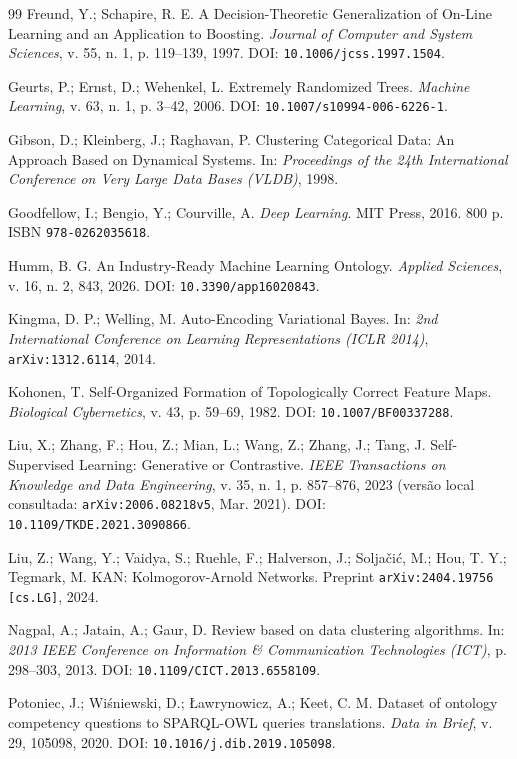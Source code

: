 \documentclass[11pt,a4paper]{article}
\begin{document}
{\begin{thebibliography}{99}
Freund, Y.; Schapire, R. E. A Decision-Theoretic Generalization of On-Line Learning and an Application to Boosting. \emph{Journal of Computer and System Sciences}, v. 55, n. 1, p. 119--139, 1997. DOI: \texttt{10.1006/jcss.1997.1504}.

Geurts, P.; Ernst, D.; Wehenkel, L. Extremely Randomized Trees. \emph{Machine Learning}, v. 63, n. 1, p. 3--42, 2006. DOI: \texttt{10.1007/s10994-006-6226-1}.

Gibson, D.; Kleinberg, J.; Raghavan, P. Clustering Categorical Data: An Approach Based on Dynamical Systems. In: \emph{Proceedings of the 24th International Conference on Very Large Data Bases (VLDB)}, 1998.

Goodfellow, I.; Bengio, Y.; Courville, A. \emph{Deep Learning}. MIT Press, 2016. 800 p. ISBN \texttt{978-0262035618}.

Humm, B. G. An Industry-Ready Machine Learning Ontology. \emph{Applied Sciences}, v. 16, n. 2, 843, 2026. DOI: \texttt{10.3390/app16020843}.

Kingma, D. P.; Welling, M. Auto-Encoding Variational Bayes. In: \emph{2nd International Conference on Learning Representations (ICLR 2014)}, \texttt{arXiv:1312.6114}, 2014.

Kohonen, T. Self-Organized Formation of Topologically Correct Feature Maps. \emph{Biological Cybernetics}, v. 43, p. 59--69, 1982. DOI: \texttt{10.1007/BF00337288}.

Liu, X.; Zhang, F.; Hou, Z.; Mian, L.; Wang, Z.; Zhang, J.; Tang, J. Self-Supervised Learning: Generative or Contrastive. \emph{IEEE Transactions on Knowledge and Data Engineering}, v. 35, n. 1, p. 857--876, 2023 (versão local consultada: \texttt{arXiv:2006.08218v5}, Mar. 2021). DOI: \texttt{10.1109/TKDE.2021.3090866}.

Liu, Z.; Wang, Y.; Vaidya, S.; Ruehle, F.; Halverson, J.; Soljačić, M.; Hou, T. Y.; Tegmark, M. KAN: Kolmogorov-Arnold Networks. Preprint \texttt{arXiv:2404.19756 [cs.LG]}, 2024.

Nagpal, A.; Jatain, A.; Gaur, D. Review based on data clustering algorithms. In: \emph{2013 IEEE Conference on Information \& Communication Technologies (ICT)}, p. 298--303, 2013. DOI: \texttt{10.1109/CICT.2013.6558109}.

Potoniec, J.; Wiśniewski, D.; Ławrynowicz, A.; Keet, C. M. Dataset of ontology competency questions to SPARQL-OWL queries translations. \emph{Data in Brief}, v. 29, 105098, 2020. DOI: \texttt{10.1016/j.dib.2019.105098}.


\end{thebibliography}}
\end{document}
